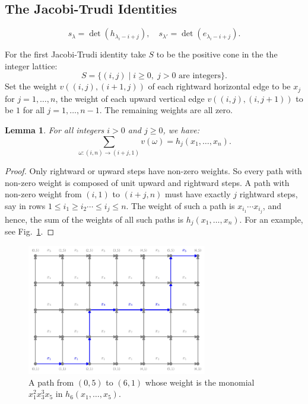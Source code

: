 \documentclass[11pt]{amsart}
\newtheorem{lemma}[theorem]{Lemma}
\theoremstyle{definition}
\theoremstyle{example}
\begin{document}
\subsection{The Jacobi-Trudi Identities}
\label{sec:jacobi-trudi-ident}
\begin{displaymath}
  s_\lambda = \det(h_{\lambda_i-i+j}), \quad s_{\lambda'} = \det(e_{\lambda_i-i+j}).
\end{displaymath}

For the first Jacobi-Trudi identity take $S$ to be the positive cone in the the integer lattice:
\begin{displaymath}
  S = \{(i,j)\mid i\geq 0,\; j>0 \text{ are integers}\}.
\end{displaymath}
Set the weight $v((i,j), (i+1,j))$ of each rightward horizontal edge to be $x_j$ for $j=1,\dotsc, n$, the weight of each upward vertical edge $v((i,j), (i,j+1))$ to be $1$ for all $j=1,\dotsc,n-1$.
The remaining weights are all zero.
\begin{lemma}
  \label{lemma:entry}
  For all integers $i>0$ and $j\geq 0$, we have:
  \begin{displaymath}
    \sum_{\omega:(i, n)\to (i+j, 1)} v(\omega) = h_j(x_1,\dotsc,x_n).
  \end{displaymath}
\end{lemma}
\begin{proof}
  Only rightward or upward steps have non-zero weights.
  So every path with non-zero weight is composed of unit upward and rightward steps.
  A path with non-zero weight from $(i, 1)$ to $(i+j, n)$ must have exactly $j$ rightward steps, say in rows $1\leq i_1\geq i_2 \dotsb \leq i_j\leq n$.
  The weight of such a path is $x_{i_1}\dotsb x_{i_j}$, and hence, the sum of the weights of all such paths is $h_j(x_1,\dotsc, x_n)$. For an example, see Fig.~\ref{fig:path_example}.
\end{proof}
\begin{figure}
  \centering
  \includegraphics[width=0.7\textwidth]{path_example.png}
  \caption{A path from $(0, 5)$ to $(6, 1)$ whose weight is the monomial $x_1^2x_3^3x_5$ in $h_6(x_1,\dotsc,x_5)$.}
  \label{fig:path_example}
\end{figure}
\end{document}
